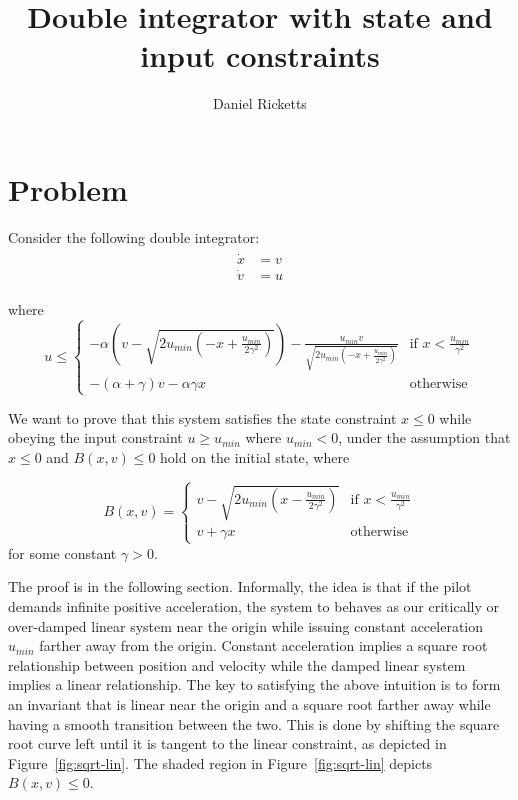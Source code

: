 \documentclass[12pt]{article}
\title{Double integrator with state and input constraints}
\author{Daniel Ricketts}
\newcommand{\umin}{u_{min}}
\newcommand{\p}{\gamma}
\newcommand{\q}{\alpha}
\begin{document}
\maketitle

\section{Problem}
Consider the following double integrator:
\begin{align}
\begin{split}
\dot{x} &= v \\
\dot{v} &= u
\end{split}
\label{sys1}
\end{align}

where
\[
u \leq
\begin{cases}
-\q(v - \sqrt{2\umin(-x + \frac{\umin}{2\p^2})}) - \frac{\umin v}{\sqrt{2\umin(-x + \frac{\umin}{2\p^2})}} & \text{if } x < \frac{\umin}{\p^2}\\
-(\q + \p) v -\q\p x & \text{otherwise}
\end{cases}
\]

We want to prove that this system satisfies the state constraint $x \leq 0$
while obeying the input constraint $u \geq \umin$ where $\umin < 0$, under
the assumption that $x \leq 0$ and $B(x,v) \leq 0$ hold on the initial
state, where

\[B(x,v) =
\begin{cases}
v - \sqrt{2\umin(x - \frac{\umin}{2\p^2})} & \text{if } x < \frac{\umin}{\p^2}\\
v + \p x & \text{otherwise}
\end{cases}
\]
for some constant $\p > 0$.

The proof is in the following section. Informally, the idea is that if the
pilot demands infinite positive acceleration, the system to behaves as our
critically or over-damped linear system near the origin while issuing
constant acceleration $\umin$ farther away from the origin. Constant
acceleration implies a square root relationship between position and
velocity while the damped linear system implies a linear relationship. The
key to satisfying the above intuition is to form an invariant that is
linear near the origin and a square root farther away while having a smooth
transition between the two. This is done by shifting the square root curve
left until it is tangent to the linear constraint, as depicted in
Figure~\ref{fig:sqrt-lin}. The shaded region in Figure~\ref{fig:sqrt-lin}
depicts $B(x,v) \leq 0$.
\end{document}
